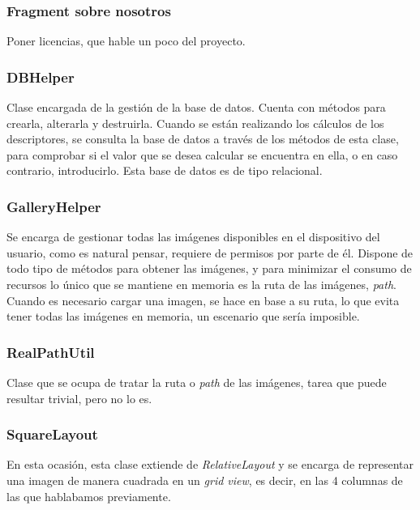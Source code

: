 \subsubsection{Fragment sobre nosotros}

Poner licencias, que hable un poco del proyecto.
 
\subsubsection{DBHelper}

Clase encargada de la gestión de la base de datos. Cuenta con métodos para crearla, alterarla y destruirla. Cuando se están realizando los cálculos de los descriptores, se consulta la base de datos a través de los métodos de esta clase, para comprobar si el valor que se desea calcular se encuentra en ella, o en caso contrario, introducirlo. Esta base de datos es de tipo relacional.

\subsubsection{GalleryHelper}

Se encarga de gestionar todas las imágenes disponibles en el dispositivo del usuario, como es natural pensar, requiere de permisos por parte de él. Dispone de todo tipo de métodos para obtener las imágenes, y para minimizar el consumo de recursos lo único que se mantiene en memoria es la ruta de las imágenes, \textit{path}. Cuando es necesario cargar una imagen, se hace en base a su ruta, lo que evita tener todas las imágenes en memoria, un escenario que sería imposible.

\subsubsection{RealPathUtil}

Clase que se ocupa de tratar la ruta o \textit{path} de las imágenes, tarea que puede resultar trivial, pero no lo es.

\subsubsection{SquareLayout}

En esta ocasión, esta clase extiende de \textit{RelativeLayout} y se encarga de representar una imagen de manera cuadrada en un \textit{grid view}, es decir, en las 4 columnas de las que hablabamos previamente.

